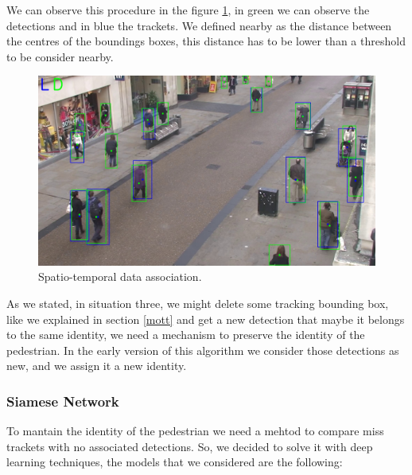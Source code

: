 \documentclass[12pt, a4paper, titlepage,twoside,openright]{article}
\begin{document}
We can observe this procedure in the figure \ref{data1}, in green we can observe the detections and in blue the trackets. We defined nearby as the distance between the centres of the boundings boxes, this distance has to be lower than a threshold to be consider nearby. 

\begin{figure}[hptb]
\centering         
\includegraphics[width=12cm]{lucasKanade/dataAssociation.jpg}
\caption{Spatio-temporal data association.} \label{data1}
\end{figure}


As we stated, in situation three, we might delete some tracking bounding box, like we explained in section \ref{mott} and get a new detection that maybe it belongs to the same identity, we need a mechanism to preserve the identity of the pedestrian. In the early version of this algorithm we consider those detections as new, and we assign it a new identity.





\subsubsection{Siamese Network}


To mantain the identity of the pedestrian we need a mehtod to compare miss trackets with no associated detections. So, we decided to solve it with deep learning techniques, the models that we considered are the following:
\end{document}
